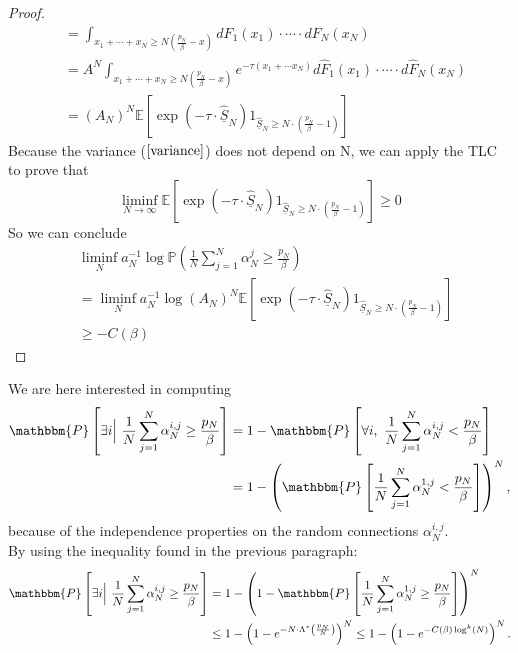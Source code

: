 \begin{proof}
\begin{align*}
&=\int_{x_1+\cdots+x_N\geq N\left(\frac{p_N}{\beta}-x\right)} dF_1(x_1)\cdot\cdots\cdot dF_N(x_N)\\
&=A^N\int_{x_1+\cdots+x_N\geq N\left(\frac{p_N}{\beta}-x\right)}e^{-\tau (x_1+\cdots x_N)} d\hat{F}_1(x_1)\cdot\cdots\cdot d\hat{F}_N(x_N)\\
& = (A_N)^N\mathbb{E}\left[\exp(-\tau\cdot \underline{\hat{S}}_N)1_{\underline{\hat{S}}_N\geq N\cdot(\frac{p_N}{\beta}-1)}\right]
\end{align*}
Because the variance ($\ref{variance}$) does not depend on N, we can apply the TLC to prove that
\[\liminf_{N\rightarrow \infty}\mathbb{E}\left[\exp(-\tau\cdot \underline{\hat{S}}_N)1_{\underline{\hat{S}}_N\geq N\cdot(\frac{p_N}{\beta}-1)}\right]\geq 0\]
So we can conclude
\begin{align*}
&\liminf_{N} a_N^{-1}\log{\mathbb{P} \left( \frac{1}{N} \sum_{j = 1}^N \alpha^{j}_N \geq \frac{p_N}{\beta}\right)}\\
&=\liminf_{N} a_N^{-1}\log{(A_N)^N\mathbb{E}\left[\exp(-\tau\cdot \underline{\hat{S}}_N)1_{\underline{\hat{S}}_N\geq N\cdot(\frac{p_N}{\beta}-1)}\right]}\\
&\geq-C(\beta)
\end{align*}
\end{proof}


\begin{remark}

We are here interested in computing \begin{align*} \mathbbm{P} \left[ \exists i \Big| \ \frac{1}{N} \sum_{j = 1}^N \alpha^{i, j}_N \geq \frac{p_N}{\beta} \right] &= 1 - \mathbbm{P} \left[ \forall i, \ \frac{1}{N} \sum_{j = 1}^N \alpha^{i, j}_N < \frac{p_N}{\beta} \right] \\ &= 1 - \left( \mathbbm{P} \left[ \frac{1}{N} \sum_{j = 1}^N \alpha^{1, j}_N < \frac{p_N}{\beta} \right] \right)^N, \end{align*} because of the independence properties on the random connections $\alpha^{i, j}_N$. \\

By using the inequality found in the previous paragraph:
\begin{align*} \mathbbm{P} \left[ \exists i \Big| \ \frac{1}{N} \sum_{j = 1}^N \alpha^{i, j}_N \geq \frac{p_N}{\beta} \right] &= 1 - \left( 1 - \mathbbm{P} \left[ \frac{1}{N} \sum_{j = 1}^N \alpha^{1, j}_N \geq \frac{p_N}{\beta} \right] \right)^N \\ &\leq 1 - \left( 1 - e^{-N \cdot \Lambda^* \left( \frac{p_N}{N} \right)} \right)^N \leq 1 - \left( 1 - e^{-C(\beta) \log^k (N)} \right)^N. \end{align*}
\end{remark}

